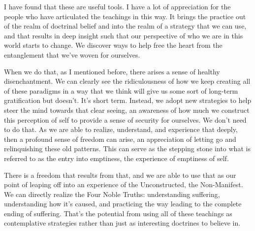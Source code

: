 I have found that these are useful tools. I have a lot of appreciation for the people who have articulated the teachings in this way. It brings the practice out of the realm of doctrinal belief and into the realm of a strategy that we can use, and that results in deep insight such that our perspective of who we are in this world starts to change. We discover ways to help free the heart from the entanglement that we've \linebreak woven for ourselves.

When we do that, as I mentioned before, there arises a sense of healthy disenchantment. We can clearly see the ridiculousness of how we keep creating all of these paradigms in a way that we think will give us some sort of long-term gratification but doesn't. It's short term. Instead, we adopt new strategies to help steer the mind towards that clear \mbox{seeing}, an awareness of how much we construct this perception of self to provide a sense of security for ourselves. We don't need to do that. As we are able to realize, understand, and experience that deeply, then a profound sense of freedom can arise, an appreciation of letting go and relinquishing these old patterns. This can serve as the stepping stone into what is referred to as the entry into emptiness, the experience of emptiness of self.

There is a freedom that results from that, and we are able to use that as our point of leaping off into an experience of the Unconstructed, the Non-Manifest. We can directly realize the Four Noble Truths: understanding suffering, understanding how it's caused, and practicing the way leading to the complete ending of suffering. That's the potential from using all of these teachings as contemplative strategies rather than just as interesting doctrines to believe in.
